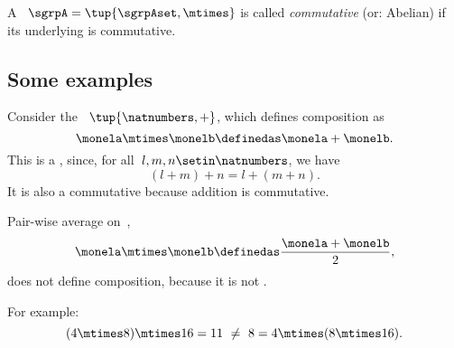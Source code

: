 \begin{definition}\label{def:commutative-semigroup}
    A ~$\sgrpA = \tup{\sgrpAset, \mtimes}$ is called \emph{commutative} (or: Abelian) if its underlying  is commutative.
\end{definition}

\subsection{Some examples}

\begin{example}
    \label{exa:natnum-semigroup}
    Consider the ~$\tup{\natnumbers,+}$, which defines composition as
    \begin{equation}
        \label{eq:natnum-semigroup-definition}
        \monela \mtimes \monelb \definedas \monela + \monelb.
    \end{equation}
    This is a , since, for all~$l,m, n \setin \natnumbers$, we have
    \begin{equation}
        (l+m)
        +n = l+(m+n).
    \end{equation}
    It is also a commutative  because addition is commutative.
\end{example}

\begin{example}
    Pair-wise average on~\reals,
    \begin{equation}
        \label{eq:pairwise}
        \monela \mtimes \monelb \definedas \frac{\monela + \monelb}{2},
    \end{equation}
    does not define  composition, because it is not .

    For example:
    \begin{equation}
        \label{eq:pairwise-counterexample}
        (4 \mtimes 8) \mtimes 16 = 11\ \neq\ 8 = 4 \mtimes (8 \mtimes 16).
    \end{equation}
\end{example}


